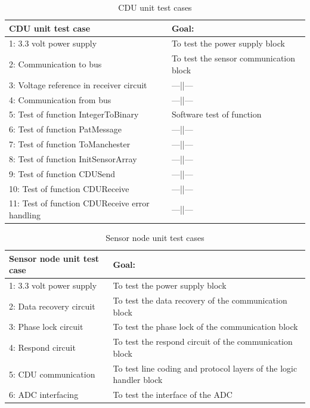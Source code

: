 \begin{table}[H]
	\centering
    \begin{tabular}{|p{6.5cm}|p{7.5cm}|}
    \hline
    CDU unit test case                             & Goal: \\ \hline
    1: 3.3 volt power supply                       & To test the power supply block\\ \hline
    2: Communication to bus                        & To test the sensor communication block     \\ \hline
    3: Voltage reference in receiver circuit       & ---||---     \\ \hline
    4: Communication from bus                      & ---||---     \\ \hline
    5: Test of function IntegerToBinary            & Software test of function     \\ \hline
    6: Test of function PatMessage                 & ---||---     \\ \hline
    7: Test of function ToManchester               & ---||---     \\ \hline
    8: Test of function InitSensorArray            & ---||---     \\ \hline
    9: Test of function CDUSend                    & ---||---     \\ \hline
    10: Test of function CDUReceive                & ---||---     \\ \hline
    11: Test of function CDUReceive error handling & ---||---     \\ \hline
    \end{tabular}
    \caption{CDU unit test cases}
    \label{tab:cduutc}
\end{table}
\begin{table}[H]
	\centering
    \begin{tabular}{|p{5.5cm}|p{8.5cm}|}
    \hline
    Sensor node unit test case                  & Goal: \\ \hline
    1: 3.3 volt power supply                    & To test the power supply block\\ \hline
    2: Data recovery circuit                 	& To test the data recovery of the communication block     \\ \hline
    3: Phase lock circuit               		& To test the phase lock of the communication block     \\ \hline
    4: Respond circuit               			& To test the respond circuit of the communication block     \\ \hline
    5: CDU communication                        & To test line coding and protocol layers of the logic handler block\\ \hline
    6: ADC interfacing 							& To test the interface of the ADC     \\ \hline 
    \end{tabular}
    \caption{Sensor node unit test cases}
    \label{tab:SNUT}
\end{table}
